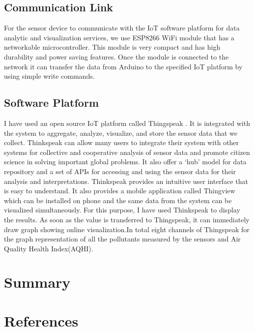 \documentclass[10pt,a4paper]{report}
\begin{document}
 \section{Communication Link}
 For the sensor device to communicate with the IoT software platform for data analytic and visualization services, we use ESP8266 WiFi module that has a networkable microcontroller. This module is very compact and has high durability and power saving features. Once the module is connected to the network it can transfer the data from Arduino to the specified IoT platform by using simple write commands.

\section{Software Platform}
 I have used an open source IoT platform called Thingspeak \cite{Thingspeak}. It is integrated with the system to aggregate, analyze, visualize, and store the sensor data that we collect\cite{Thingspeak}. Thinkspeak can allow many users to integrate their system with other systems for collective and cooperative analysis of sensor data and promote citizen science in solving important global problems. It also offer a ‘hub’ model for data repository and a set of APIs for accessing and using the sensor data for their analysis and interpretations. Thinkspeak provides an intuitive user interface that is easy to understand. It also provides a mobile application called Thingview which can be installed on phone and the same data from the system can be visualized simultaneously.
For this purpose, I have used Thinkspeak to display the results. As soon as the value is transferred to Thingspeak, it can immediately draw graph showing online visualization.In total eight channels of Thingspeak for the graph representation of all the pollutants measured by the sensors and Air Quality Health Index(AQHI).




\chapter{Summary}

\chapter*{References}
\end{document}
